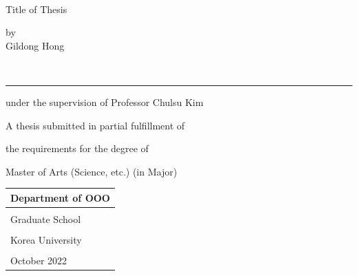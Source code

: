 \documentclass[11pt]{report}
\theoremstyle{plain}
\theoremstyle{definition}
\theoremstyle{corollary}
\theoremstyle{definition}
\theoremstyle{plain}
\theoremstyle{definition}
\theoremstyle{plain}
\begin{document}
\newpage
~
%
%
%
%
%
%


\newpage
\begin{center}
\huge Title of Thesis
\par\vspace{50pt}
\Large by\\
Gildong Hong
\par\vspace{20pt}
{\small\color{gray}{student signiture}}\\[-15pt]
\rule{.6\textwidth}{0.4pt}
\par\vspace{20pt}
under the supervision of Professor Chulsu Kim
\par\vspace{20pt}
A thesis submitted in partial fulfillment of \par
the requirements for the degree of \par
Master of Arts (Science, etc.) (in Major)
\par\vspace{10pt}
\end{center}
\noindent
\begin{tabularx}{\textwidth}{| >{\centering\arraybackslash}X |}
\arrayrulecolor{gray}
\hline
\Large Department of OOO \\\hline
\rule{0pt}{30pt}\\\hline
\LARGE Graduate School \\\hline
\\[-8pt]\hline
\LARGE Korea University \\\hline
\rule{0pt}{20pt}\\\hline
\large October 2022 \\\hline
\end{tabularx}
\end{document}
